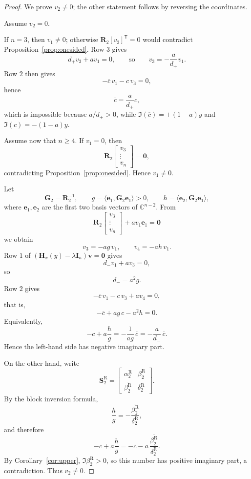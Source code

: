 \documentclass[11pt]{article}
\numberwithin{equation}{section}
\newcommand{\C}{\mathbb C}
\newcommand{\I}{\mathbf I}
\newcommand{\Hmat}{\mathbf H}
\begin{document}
\begin{proof}
We prove \(v_2\neq0\); the other statement follows by reversing the coordinates.

Assume \(v_2=0\).

If \(n=3\), then \(v_1\neq0\); otherwise \(\mathbf R_2[v_3]^{\mathsf T}=0\) would
contradict Proposition~\ref{prop:onesided}.  Row \(3\) gives
\[
d_+v_3+av_1=0,
\qquad\text{so}\qquad
v_3=-\frac{a}{d_+}v_1.
\]
Row \(2\) then gives
\[
-\overline c\,v_1-c\,v_3=0,
\]
hence
\[
\overline c=\frac{a}{d_+}c,
\]
which is impossible because \(a/d_+>0\), while
\(\Im(\overline c)=+(1-a)y\) and \(\Im(c)=-(1-a)y\).

Assume now that \(n\ge4\).  If \(v_1=0\), then
\[
\mathbf R_2
\begin{bmatrix}
v_3\\
\vdots\\
v_n
\end{bmatrix}
=
\bm0,
\]
contradicting Proposition~\ref{prop:onesided}.  Hence \(v_1\neq0\).

Let
\[
\mathbf G_2=\mathbf R_2^{-1},
\qquad
g=\langle \bm e_1,\mathbf G_2\bm e_1\rangle>0,
\qquad
h=\langle \bm e_2,\mathbf G_2\bm e_1\rangle,
\]
where \(\bm e_1,\bm e_2\) are the first two basis vectors of \(\C^{n-2}\).
From
\[
\mathbf R_2
\begin{bmatrix}
v_3\\
\vdots\\
v_n
\end{bmatrix}
+
av_1\bm e_1
=
\bm0
\]
we obtain
\[
v_3=-ag\,v_1,
\qquad
v_4=-ah\,v_1.
\]
Row \(1\) of
\((\Hmat_x(y)-\lambda\I_n)\bm v=\bm0\) gives
\[
d_-v_1+av_3=0,
\]
so
\[
d_-=a^2g.
\]
Row \(2\) gives
\[
-\overline c\,v_1-c\,v_3+av_4=0,
\]
that is,
\[
-\overline c+ag\,c-a^2h=0.
\]
Equivalently,
\[
-c+a\frac{h}{g}
=
-\frac{1}{ag}\,\overline c
=
-\frac{a}{d_-}\,\overline c.
\]
Hence the left-hand side has negative imaginary part.

On the other hand, write
\[
\mathbf S_2^{\mathrm R}
=
\begin{bmatrix}
\alpha_2^{\mathrm R} & \beta_2^{\mathrm R}\\
\overline{\beta_2^{\mathrm R}} & \delta_2^{\mathrm R}
\end{bmatrix}.
\]
By the block inversion formula,
\[
\frac{h}{g}
=
-\frac{\overline{\beta_2^{\mathrm R}}}{\delta_2^{\mathrm R}},
\]
and therefore
\[
-c+a\frac{h}{g}
=
-c-a\,\frac{\overline{\beta_2^{\mathrm R}}}{\delta_2^{\mathrm R}}.
\]
By Corollary~\ref{cor:upper}, \(\Im\beta_2^{\mathrm R}>0\), so this number has positive
imaginary part, a contradiction.  Thus \(v_2\neq0\).
\end{proof}
\end{document}
